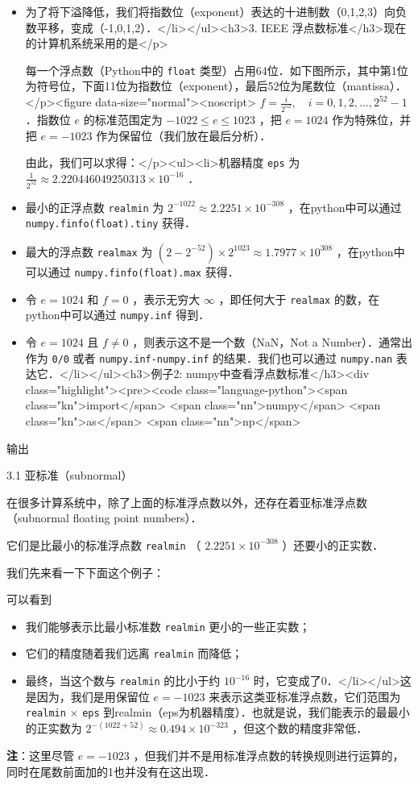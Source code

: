 \begin{itemize}
\item 为了将下溢降低，我们将指数位（exponent）表达的十进制数（0,1,2,3）向负数平移，变成（-1,0,1,2）．</li></ul><h3>3. IEEE 浮点数标准</h3>现在的计算机系统采用的是</p>

每一个浮点数（Python中的 \verb|float| 类型）占用64位．如下图所示，其中第1位为符号位，下面11位为指数位（exponent），最后52位为尾数位（mantissa）．</p><figure data-size="normal"><noscript> $f=\frac{i}{2^{52}},\quad i=0,1,2,...,2^{52}-1$  ．指数位  $e$  的标准范围定为  $-1022\le e\le 1023$  ，把  $e=1024$  作为特殊位，并把  $e=-1023$  作为保留位（我们放在最后分析）．

由此，我们可以求得：</p><ul><li>机器精度 \verb|eps| 为  $\frac{1}{2^{52}}\approx 2.220446049250313\times10^{-16}$  ．
\item 最小的正浮点数 \verb|realmin| 为  $2^{-1022}\approx2.2251\times10^{-308}$  ，在python中可以通过 \verb|numpy.finfo(float).tiny| 获得．
\item 最大的浮点数 \verb|realmax| 为 $(2-2^{-52})\times2^{1023}\approx1.7977\times10^{308}$  ，在python中可以通过 \verb|numpy.finfo(float).max| 获得．
\item 令  $e=1024$  和  $f=0$  ，表示无穷大  $\infty$  ，即任何大于 \verb|realmax| 的数，在python中可以通过 \verb|numpy.inf| 得到．
\item 令  $e=1024$  且  $f\neq0$  ，则表示这不是一个数（NaN，Not a Number）．通常出作为 \verb|0/0| 或者 \verb|numpy.inf-numpy.inf| 的结果．我们也可以通过 \verb|numpy.nan| 表达它．</li></ul><h3>例子2: numpy中查看浮点数标准</h3><div class="highlight"><pre><code class="language-python"><span class="kn">import</span> <span class="nn">numpy</span> <span class="kn">as</span> <span class="nn">np</span>
\end{itemize}


输出

3.1 亚标准（subnormal）

在很多计算系统中，除了上面的标准浮点数以外，还存在着亚标准浮点数（subnormal floating point numbers）． 

它们是比最小的标准浮点数 \verb|realmin| （  $2.2251\times10^{-308}$  ）还要小的正实数．

我们先来看一下下面这个例子：

可以看到

\begin{itemize}
\item 我们能够表示比最小标准数 \verb|realmin| 更小的一些正实数；
\item 它们的精度随着我们远离 \verb|realmin| 而降低；
\item 最终，当这个数与 \verb|realmin| 的比小于约  $10^{-16}$  时，它变成了0．</li></ul>这是因为，我们是用保留位  $e=-1023$  来表示这类亚标准浮点数，它们范围为 \verb|realmin|   $\times$   \verb|eps| 到realmin（eps为机器精度）．也就是说，我们能表示的最最小的正实数为  $2^{-(1022+52)}\approx 0.494\times10^{-323}$  ，但这个数的精度非常低．
\end{itemize}

\textbf{注}：这里尽管  $e=-1023$  ，但我们并不是用标准浮点数的转换规则进行运算的，同时在尾数前面加的1也并没有在这出现．
